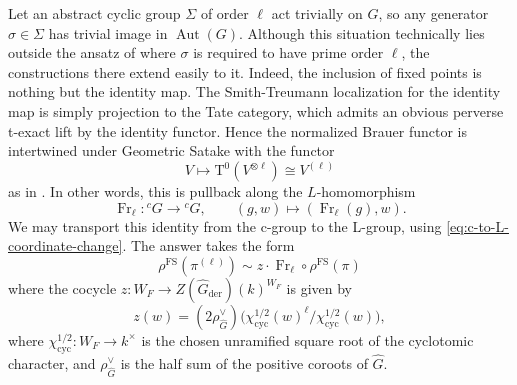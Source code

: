 \documentclass[reqno]{amsart}
\numberwithin{equation}{subsection}
\newcommand{\wh}[1]{\widehat{#1}}
\newcommand{\co}{\colon}
\newcommand{\lc}{{}^c}
\DeclareMathOperator{\cyc}{cyc}
\DeclareMathOperator{\Aut}{Aut}
\DeclareMathOperator{\ad}{ad}
\DeclareMathOperator{\FS}{FS}
\DeclareMathOperator{\der}{der}
\DeclareMathOperator{\Fr}{Fr}
\newcommand{\rT}{\ensuremath{\mathrm{T}}\xspace}
\newcommand{\bT}{\mathbf{T}}
\newcommand{\bW}{\mathbf{W}}
\newcommand{\chG}{\check{G}}
\newcommand{\chH}{\check{H}}
\newcommand{\chpsi}{\check{\psi}}
\newtheorem{lemma}[thm]{Lemma}
\theoremstyle{remark}
\numberwithin{equation}{subsection}
\numberwithin{figure}{subsection}
\begin{document}
Let an abstract cyclic group $\Sigma$ of order $\ell$ act trivially on $G$, so any generator $\sigma \in \Sigma$ has trivial image in $\Aut(G)$. Although this situation technically lies outside the ansatz of \cite{F24} where $\sigma$ is required to have prime order $\ell$, the constructions there extend easily to it. Indeed, the inclusion of fixed points is nothing but the identity map. The Smith-Treumann localization for the identity map is simply projection to the Tate category, which admits an obvious perverse t-exact lift by the identity functor. Hence the normalized Brauer functor is intertwined under Geometric Satake with the functor 
\[
V \mapsto \rT^0(V^{\otimes \ell})\cong V^{(\ell)}
\]
as in \cite[Example 3.7.2]{F24}. In other words, this is pullback along the $L$-homomorphism
\[
\Fr_\ell\co\lc G\longrightarrow\lc G,\qquad (g,w)\longmapsto(\Fr_\ell(g),w).
\]
We may transport this identity from the c-group to the L-group, using \eqref{eq:c-to-L-coordinate-change}. The answer takes the form
\begin{equation}\label{eq:fs-coefficient-frobenius}
\rho^{\FS}(\pi^{(\ell)})
\sim z \cdot\Fr_\ell\circ\rho^{\FS}(\pi)
\end{equation}
where the cocycle $z \co W_F \rightarrow Z(\wh G_{\der})(k)^{W_F}$ is given by 
\[
z(w) =(2\rho_{\wh G}^{\vee})\bigl(\chi_{\cyc}^{1/2} (w)^\ell/\chi_{\cyc}^{1/2} (w)\bigr),
\]
where $\chi_{\cyc}^{1/2} \co W_F\to k^\times$ is the chosen unramified square root of the cyclotomic character, and $\rho_{\wh G}^{\vee}$ is the half sum of the positive coroots of $\wh G$. 








\end{document}

